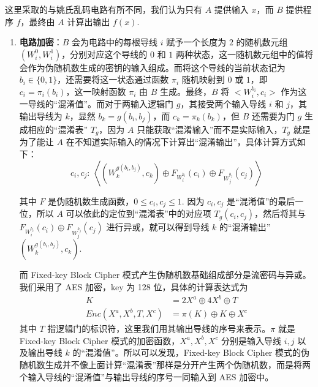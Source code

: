 这里采取的与姚氏乱码电路有所不同，我们认为只有 $A$ 提供输入 $x$，而 $B$ 提供程序 $f$，最终由 $A$ 计算出输出 $f(x)$.

\begin{enumerate}
    \item \textbf{电路加密}：$B$ 会为电路中的每根导线 $i$ 赋予一个长度为 $2$ 的随机数元组 $(W_i^0, W_i^1)$，分别对应这个导线的 $0$ 和 $1$ 两种状态，这一随机数元组中的值将会作为伪随机数生成的密钥的输入组成。而将这个导线的当前状态记为 $b_i \in \{0, 1\}$，还需要将这一状态通过函数 $\pi_i$ 随机映射到 $0$ 或 $1$，即 $c_i = \pi_i(b_i)$，这一映射函数 $\pi_i$ 由 $B$ 生成。最终，$B$ 将 $<W_i^{b_i}, c_i>$ 作为这一导线的“混淆值”。而对于两输入逻辑门 $g$，其接受两个输入导线 $i$ 和 $j$，其输出导线为 $k$，显然 $b_k = g(b_i, b_j)$，而 $c_k = \pi_k(b_k)$，但 $B$ 还需要为门 $g$ 生成相应的“混淆表” $T_g$，因为 $A$ 只能获取“混淆输入”而不是实际输入，$T_g$ 就是为了能让 $A$ 在不知道实际输入的情况下计算出“混淆输出”，具体计算方式如下： \[
        c_i, c_j: \ \left<(W_k^{g(b_i, b_j)}, c_k) \oplus F_{W_i^{b_i}} (c_i) \oplus F_{W_j^{b_j}} (c_j)\right> 
    \]

    其中 $F$ 是伪随机数生成函数，$0 \leqslant c_i, c_j \leqslant 1$. 因为 $c_i, c_j$ 是“混淆值”的最后一位，所以 $A$ 可以依此的定位到“混淆表”中的对应项 $T_g (c_i, c_j)$，然后将其与 $F_{W_i^{b_i}} (c_i) \oplus F_{W_j^{b_j}} (c_j)$ 进行异或，就可以得到导线 $k$ 的“混淆输出” $(W_k^{g(b_i, b_j)}, c_k)$. 

    而 Fixed-key Block Cipher 模式产生伪随机数基础组成部分是流密码与异或。我们采用了 AES 加密，key 为 128 位，具体的计算表达式为 \begin{align}
        K & {} = 2 X^a \oplus 4 X^b \oplus T \\
        Enc(X^a, X^b, T, X^c) & {} = \pi(K) \oplus K \oplus X^c 
    \end{align}
    其中 $T$ 指逻辑门的标识符，这里我们用其输出导线的序号来表示。$\pi$ 就是 Fixed-key Block Cipher 模式的加密函数，$X^a, X^b, X^c$ 分别是输入导线 $i, j$ 以及输出导线 $k$ 的“混淆值”。所以可以发现，Fixed-key Block Cipher 模式的伪随机数生成并不像上面计算“混淆表”那样是分开产生两个伪随机数，而是将两个输入导线的“混淆值”与输出导线的序号一同输入到 AES 加密中。


\end{enumerate}
